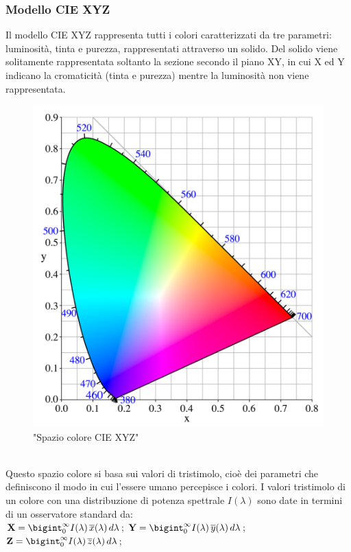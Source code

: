 \documentclass[a4paper,11pt]{article}
\begin{document}
        \subsubsection{Modello CIE XYZ}
        Il modello CIE XYZ rappresenta tutti i colori caratterizzati da tre parametri: luminosità, tinta e purezza, rappresentati attraverso un solido. 
        Del solido viene solitamente rappresentata soltanto la sezione secondo il piano XY, in cui X ed Y indicano la cromaticità (tinta e purezza) mentre la luminosità non viene rappresentata.
        \begin{figure}[h]
            \centering
            \includegraphics[scale=0.2]{CIEXYZ.png}
            \caption{"Spazio colore CIE XYZ"}
        \end{figure}
        \\Questo spazio colore si basa sui valori di tristimolo, cioè dei parametri che definiscono il modo in cui l'essere umano percepisce i colori. 
        I valori tristimolo di un colore con una distribuzione di potenza spettrale $I(\lambda)$  sono date in termini di un osservatore standard da:
        \\[0.2in]
            $\textbf{X}=\bigint_0^\infty I(\lambda)\,\overline{x}(\lambda)\,d\lambda$;
            $\textbf{Y}=\bigint_0^\infty I(\lambda)\,\overline{y}(\lambda)\,d\lambda$;
            $\textbf{Z}=\bigint_0^\infty I(\lambda)\,\overline{z}(\lambda)\,d\lambda$;
      
\end{document}
